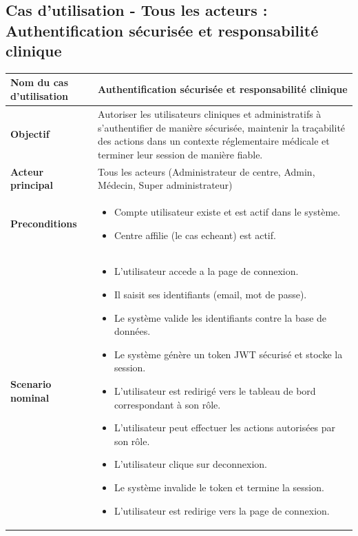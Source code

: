 \subsection{Cas d'utilisation - Tous les acteurs : Authentification sécurisée et responsabilité clinique}
\begin{table}[H]
\centering
\renewcommand{\arraystretch}{1.3}
\begin{tabular}{|p{5cm}|p{10cm}|}
\hline
\textbf{Nom du cas d'utilisation} & Authentification sécurisée et responsabilité clinique \\ \hline

\textbf{Objectif} & Autoriser les utilisateurs cliniques et administratifs à s'authentifier de manière sécurisée, maintenir la traçabilité des actions dans un contexte réglementaire médicale et terminer leur session de manière fiable. \\ \hline

\textbf{Acteur principal} & Tous les acteurs (Administrateur de centre, Admin, Médecin, Super administrateur) \\ \hline

\textbf{Preconditions} &
\begin{itemize}
\item Compte utilisateur existe et est actif dans le système.
\item Centre affilie (le cas echeant) est actif.
\end{itemize} \\ \hline

\textbf{Scenario nominal} &
\begin{itemize}
\item L'utilisateur accede a la page de connexion.
\item Il saisit ses identifiants (email, mot de passe).
\item Le système valide les identifiants contre la base de données.
\item Le système génère un token JWT sécurisé et stocke la session.
\item L'utilisateur est redirigé vers le tableau de bord correspondant à son rôle.
\item L'utilisateur peut effectuer les actions autorisées par son rôle.
\item L'utilisateur clique sur deconnexion.
\item Le système invalide le token et termine la session.
\item L'utilisateur est redirige vers la page de connexion.
\end{itemize} \\ \hline


\end{tabular}
\end{table}
